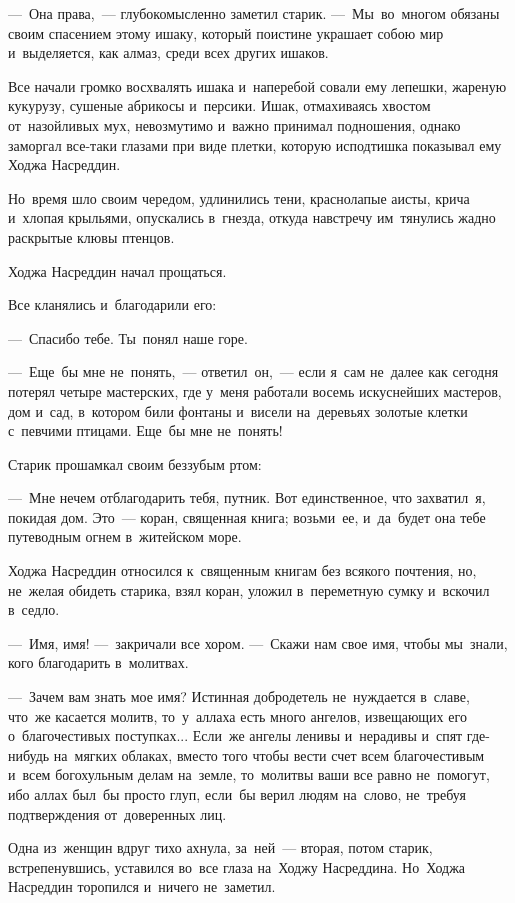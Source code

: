 \documentclass[12pt,a4paper]{book}
\begin{document}
—~Она права,~— глубокомысленно заметил старик. —~Мы~во~многом обязаны своим спасением этому ишаку, который поистине украшает собою мир и~выделяется, как алмаз, среди всех других ишаков.

Все начали громко восхвалять ишака и~наперебой совали ему лепешки, жареную кукурузу, сушеные абрикосы и~персики. Ишак, отмахиваясь хвостом от~назойливых мух, невозмутимо и~важно принимал подношения, однако заморгал все-таки глазами при виде плетки, которую исподтишка показывал ему Ходжа Насреддин.

Но~время шло своим чередом, удлинились тени, краснолапые аисты, крича и~хлопая крыльями, опускались в~гнезда, откуда навстречу им~тянулись жадно раскрытые клювы птенцов.

Ходжа Насреддин начал прощаться.

Все кланялись и~благодарили его:

—~Спасибо тебе. Ты~понял наше горе.

—~Еще~бы мне не~понять,~— ответил~он,~— если я~сам не~далее как сегодня потерял четыре мастерских, где у~меня работали восемь искуснейших мастеров, дом и~сад, в~котором били фонтаны и~висели на~деревьях золотые клетки с~певчими птицами. Еще~бы мне не~понять!

Старик прошамкал своим беззубым ртом:

—~Мне нечем отблагодарить тебя, путник. Вот единственное, что захватил~я, покидая дом. Это~— коран, священная книга; возьми~ее, и~да~будет она тебе путеводным огнем в~житейском море.

Ходжа Насреддин относился к~священным книгам без всякого почтения, но, не~желая обидеть старика, взял коран, уложил в~переметную сумку и~вскочил в~седло.

—~Имя, имя! —~закричали все хором. —~Скажи нам свое имя, чтобы мы~знали, кого благодарить в~молитвах.

—~Зачем вам знать мое имя? Истинная добродетель не~нуждается в~славе, что~же касается молитв, то~у~аллаха есть много ангелов, извещающих его о~благочестивых поступках... Если~же ангелы ленивы и~нерадивы и~спят где-нибудь на~мягких облаках, вместо того чтобы вести счет всем благочестивым и~всем богохульным делам на~земле, то~молитвы ваши все равно не~помогут, ибо аллах был~бы просто глуп, если~бы верил людям на~слово, не~требуя подтверждения от~доверенных лиц.

Одна из~женщин вдруг тихо ахнула, за~ней~— вторая, потом старик, встрепенувшись, уставился во~все глаза на~Ходжу Насреддина. Но~Ходжа Насреддин торопился и~ничего не~заметил.
\end{document}
